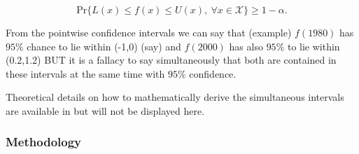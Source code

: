 \begin{equation}
\text{Pr}\Big\{L(x)\leq f(x)\leq U(x), \ \forall x\in\mathcal{X}\Big\}\geq 1-\alpha.
\end{equation}

From the pointwise confidence intervals we can say that (example) $f(1980)$ has $95\%$ chance to lie within (-1,0) (say) and $f(2000)$ has also $95\%$ to lie within (0.2,1.2) BUT it is a fallacy to say simultaneously that both are contained in these intervals at the same time with $95\%$ confidence. \citet[section 6.5]{ruppert_semiparametric_2003}

Theoretical details on how to mathematically derive the simultaneous intervals are available in \citet[pp.142-144]{ruppert_semiparametric_2003} but will not be displayed here.

\subsubsection*{Methodology}

